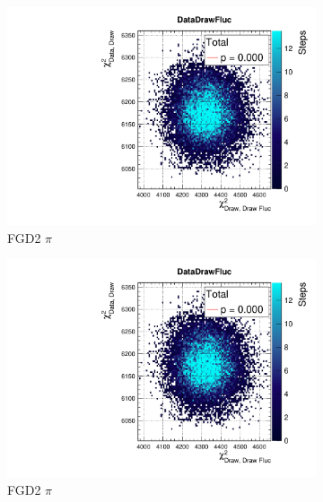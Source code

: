 \begin{figure}[h]
	\begin{subfigure}[t]{0.32\textwidth}
		\includegraphics[width=\textwidth, trim={20mm 6mm 4mm 11mm}, clip,page=88]{figures/mach3/2018/data/2018a_FixedCov_RedCov_Mpi_Data_merge_PostPredStore_FullLLH_procs}
		\caption{FGD2 $\pi$}
	\end{subfigure}
	\begin{subfigure}[t]{0.32\textwidth}
		\includegraphics[width=\textwidth, trim={20mm 6mm 4mm 11mm}, clip,page=97]{figures/mach3/2018/data/2018a_FixedCov_RedCov_Mpi_Data_merge_PostPredStore_FullLLH_procs}
		\caption{FGD2 $\pi$}
	\end{subfigure}
	\begin{subfigure}[t]{0.32\textwidth}

\end{subfigure}
\end{figure}
